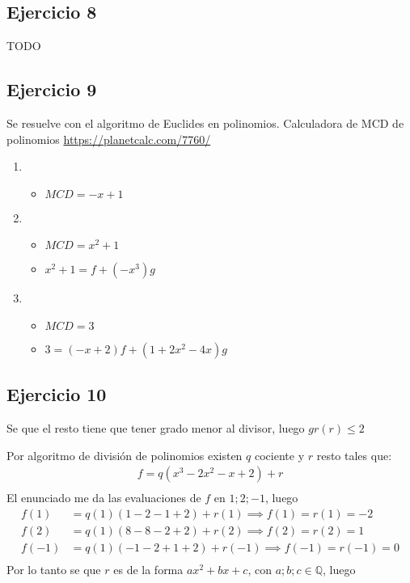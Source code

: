 \subsection{Ejercicio 8}
TODO

\subsection{Ejercicio 9}

Se resuelve con el algoritmo de Euclides en polinomios. Calculadora de MCD de polinomios \url{https://planetcalc.com/7760/}

\begin{enumerate}
    \item \begin{itemize}
        \item $ MCD = -x+1 $
    \end{itemize}
    \item \begin{itemize}
        \item $ MCD = x^2 + 1 $
        \item $ x^2 + 1 = f + (-x^3)g $
    \end{itemize}
    \item \begin{itemize}
        \item $ MCD = 3 $
        \item $ 3 = (-x+2)f + (1+2x^2 - 4x)g $
    \end{itemize}
\end{enumerate}

\subsection{Ejercicio 10}

Se que el resto tiene que tener grado menor al divisor, luego $ gr(r) \leq 2 $

Por algoritmo de división de polinomios existen $ q $ cociente y $ r $ resto tales que:
\begin{align*}
    f = q(x^3-2x^2-x+2) + r \\
\end{align*}
El enunciado me da las evaluaciones de $f$ en $ 1; 2; -1 $, luego
\begin{align*}
    f(1) &= q(1)(1-2-1+2) + r(1) \implies f(1) = r(1) = -2 \\ 
    f(2) &= q(1)(8-8-2+2) + r(2) \implies f(2) = r(2) = 1 \\ 
    f(-1) &= q(1)(-1-2+1+2) + r(-1) \implies f(-1) = r(-1) = 0 \\ 
\end{align*}
Por lo tanto se que $ r $ es de la forma $ ax^2 + bx + c $, con $ a;b;c \in \mathbb{Q} $, luego

